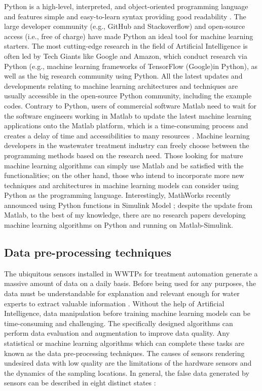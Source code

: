 Python is a high-level, interpreted, and object-oriented programming language and features simple and easy-to-learn syntax providing good readability \citep{pythonsoftwarefundationWhatPythonExecutive2022}. The large developer community (e.g., GitHub and Stackoverflow) and open-source access (i.e., free of charge) have made Python an ideal tool for machine learning starters. The most cutting-edge research in the field of Artificial Intelligence is often led by Tech Giants like Google and Amazon, which conduct research via Python (e.g., machine learning frameworks of TensorFlow (Google)in Python), as well as the big research community using Python. All the latest updates and developments relating to machine learning architectures and techniques are usually accessible in the open-source Python community, including the example codes. Contrary to Python, users of commercial software Matlab need to wait for the software engineers working in Matlab to update the latest machine learning applications onto the Matlab platform, which is a time-consuming process and creates a delay of time and accessibilities to many resources \citep{castroWhyShouldChoose2018}. Machine learning developers in the wastewater treatment industry can freely choose between the programming methods based on the research need. Those looking for mature machine learning algorithms can simply use Matlab and be satisfied with the functionalities; on the other hand, those who intend to incorporate more new techniques and architectures in machine learning models can consider using Python as the programming language. Interestingly, MathWorks recently announced using Python functions in Simulink Model \citep{mathworksCallPythonFunction2022}; despite the update from Matlab, to the best of my knowledge, there are no research papers developing machine learning algorithms on Python and running on Matlab-Simulink.

\subsection{Data pre-processing techniques}
The ubiquitous sensors installed in WWTPs for treatment automation generate a massive amount of data on a daily basis. Before being used for any purposes, the data must be understandable for explanation and relevant enough for water experts to extract valuable information \citep{kehreinCriticalReviewResource2020}. Without the help of Artificial Intelligence, data manipulation before training machine learning models can be time-consuming and challenging. The specifically designed algorithms can perform data evaluation and augmentation to improve data quality. Any statistical or machine learning algorithms which can complete these tasks are known as the data pre-processing techniques. The causes of sensors rendering undesired data with low quality are the limitations of the hardware sensors and the dynamics of the sampling locations. In general, the false data generated by sensors can be described in eight distinct states \citep{rosenAddingRealismSimulated2008,newhartDatadrivenPerformanceAnalyses2019}:

